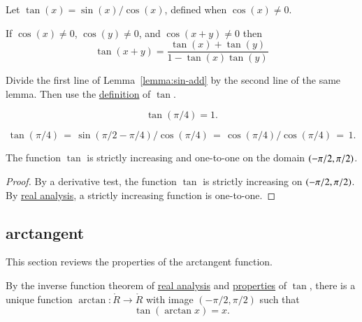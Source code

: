 \begin{definition}[tangent]\label{def:tan}
Let $\tan(x) = \sin(x)/\cos(x)$, defined when $\cos(x)\ne0$.
%
%
\end{definition}


\begin{lemma}\label{lemma:tan-add}
    If $\cos(x)\ne 0$, $\cos(y)\ne 0$, and $\cos(x+y)\ne0$ then
    $$\tan(x+y) = \frac{\tan(x) + \tan(y) }{ 1 - \tan(x)\tan(y)}$$
\end{lemma}
%

\begin{proved}
  Divide the first line of Lemma~\ref{lemma:sin-add} by the second
  line of the same lemma.  Then use the \hyperref[def:tan]{definition} of $\tan$.
\swallowed\end{proved}

\begin{lemma}\label{lemma:tan-pi4}
    $$\tan(\pi/4) = 1.$$
\end{lemma}

\begin{proved}  
    $$\tan(\pi/4) \hyperref[def:tan]{\,=\,} \sin(\pi/2-\pi/4)/\cos(\pi/4) 
    \hyperref[lemma:cos-sin]{\,=\,}
    \cos(\pi/4)/\cos(\pi/4) \hyperref[eqn:cospi2]{\,=\,} 1.$$
\swallowed\end{proved}

\begin{lemma}\guid{}\label{lemma:tan-monotone}
The function $\tan$ is strictly increasing and one-to-one on the domain
$(-\pi/2,\pi/2)$.
\end{lemma}

\begin{proof} By a derivative test,
the function $\tan$ is strictly increasing on $(-\pi/2,\pi/2)$.
By \hyperref[back:analysis]{real analysis}, 
a strictly increasing function is one-to-one.
\end{proof}

\subsection{arctangent}

This section reviews the properties of the arctangent function.  

\begin{definition}[arctangent]\label{def:arctan}
By the inverse function theorem of \hyperref[back:analysis]{real analysis} and
\hyperref[lemma:tan-monotone]{properties} of $\tan$, 
there is a unique function $\arctan:\ring{R}\to\ring{R}$ with
image $(-\pi/2,\pi/2)$ such that
    $$\tan(\arctan x) =x.$$
%
\end{definition}

